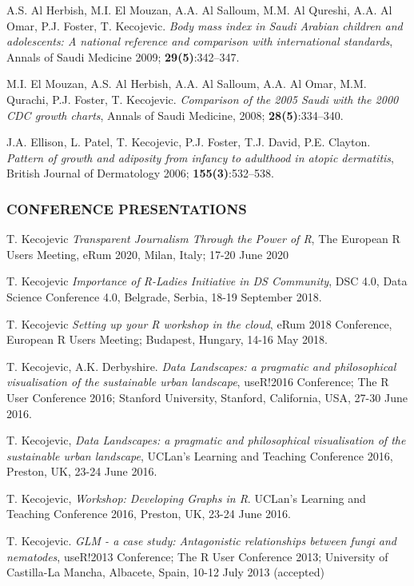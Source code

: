 \documentclass[
]{article}
\begin{document}
A.S. Al Herbish, M.I. El Mouzan, A.A. Al Salloum, M.M. Al Qureshi, A.A.
Al Omar, P.J. Foster, T. Kecojevic. \emph{Body mass index in Saudi
Arabian children and adolescents: A national reference and comparison
with international standards}, Annals of Saudi Medicine 2009;
\textbf{29(5)}:342--347.

M.I. El Mouzan, A.S. Al Herbish, A.A. Al Salloum, A.A. Al Omar, M.M.
Qurachi, P.J. Foster, T. Kecojevic. \emph{Comparison of the 2005 Saudi
with the 2000 CDC growth charts}, Annals of Saudi Medicine, 2008;
\textbf{28(5)}:334--340.

J.A. Ellison, L. Patel, T. Kecojevic, P.J. Foster, T.J. David, P.E.
Clayton. \emph{Pattern of growth and adiposity from infancy to adulthood
in atopic dermatitis}, British Journal of Dermatology 2006;
\textbf{155(3)}:532--538.

\hypertarget{conference-presentations}{%
\subsubsection{CONFERENCE
PRESENTATIONS}\label{conference-presentations}}

T. Kecojevic \emph{Transparent Journalism Through the Power of R}, The
European R Users Meeting, eRum 2020, Milan, Italy; 17-20 June 2020

T. Kecojevic \emph{Importance of R-Ladies Initiative in DS Community},
DSC 4.0, Data Science Conference 4.0, Belgrade, Serbia, 18-19 September
2018.

T. Kecojevic \emph{Setting up your R workshop in the cloud}, eRum 2018
Conference, European R Users Meeting; Budapest, Hungary, 14-16 May 2018.

T. Kecojevic, A.K. Derbyshire. \emph{Data Landscapes: a pragmatic and
philosophical visualisation of the sustainable urban landscape},
useR!2016 Conference; The R User Conference 2016; Stanford University,
Stanford, California, USA, 27-30 June 2016.

T. Kecojevic, \emph{Data Landscapes: a pragmatic and philosophical
visualisation of the sustainable urban landscape}, UCLan's Learning and
Teaching Conference 2016, Preston, UK, 23-24 June 2016.

T. Kecojevic, \emph{Workshop: Developing Graphs in R}. UCLan's Learning
and Teaching Conference 2016, Preston, UK, 23-24 June 2016.

T. Kecojevic. \emph{GLM - a case study: Antagonistic relationships
between fungi and nematodes}, useR!2013 Conference; The R User
Conference 2013; University of Castilla-La Mancha, Albacete, Spain,
10-12 July 2013 (accepted)
\end{document}
